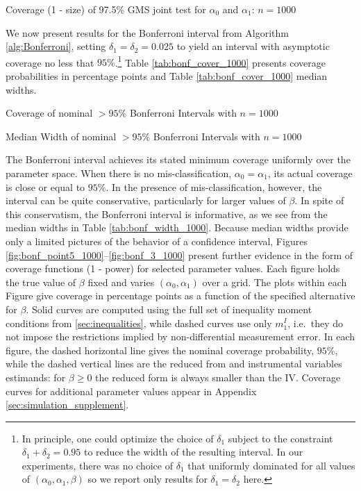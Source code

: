 \begin{table}
  \small
  \centering
  
  \caption{Coverage (1 - size) of 97.5\% GMS joint test for $\alpha_0$ and $\alpha_1$: $n = 1000$}
  \label{tab:alphas_cover_97point5_1000}
\end{table}

We now present results for the Bonferroni interval from Algorithm \ref{alg:Bonferroni}, setting $\delta_1 = \delta_2 = 0.025$ to yield an interval with asymptotic coverage no less that $95\%$.\footnote{In principle, one could optimize the choice of $\delta_1$ subject to the constraint $\delta_1 + \delta_2 = 0.95$ to reduce the width of the resulting interval. In our experiments, there was no choice of $\delta_1$ that uniformly dominated for all values of $(\alpha_0, \alpha_1, \beta)$ so we report only results for $\delta_1 = \delta_2$ here.}
Table \ref{tab:bonf_cover_1000} presents coverage probabilities in percentage points and Table \ref{tab:bonf_cover_1000} median widths.


\begin{table}[htbp]
  \centering
  \small
  
  \caption{Coverage of nominal $>95\%$ Bonferroni Intervals with $n = 1000$}
  \label{tab:bonf_cover_1000}
\end{table}

\begin{table}
  \small
  \centering
  
  \caption{Median Width of nominal $>95\%$ Bonferroni Intervals with $n = 1000$}
  \label{tab:bonf_width_1000}
\end{table}

The Bonferroni interval achieves its stated minimum coverage uniformly over the parameter space.
When there is no mis-classification, $\alpha_0 = \alpha_1$, its actual coverage is close or equal to $95\%$.
In the presence of mis-classification, however, the interval can be quite conservative, particularly for larger values of $\beta$.
In spite of this conservatism, the Bonferroni interval is informative, as we see from the median widths in Table \ref{tab:bonf_width_1000}. 
Because median widths provide only a limited pictures of the behavior of a confidence interval, Figures \ref{fig:bonf_point5_1000}--\ref{fig:bonf_3_1000} present further evidence in the form of coverage functions (1 - power) for selected parameter values.
Each figure holds the true value of $\beta$ fixed and varies $(\alpha_0, \alpha_1)$ over a grid. 
The plots within each Figure give coverage in percentage points as a function of the specified alternative for $\beta$.
Solid curves are computed using the full set of inequality moment conditions from \ref{sec:inequalities}, while dashed curves use only $m_{1}^I$, i.e.\ they do not impose the restrictions implied by non-differential measurement error.
In each figure, the dashed horizontal line gives the nominal coverage probability, $95\%$, while the dashed vertical lines are the reduced from  and instrumental variables estimands: for $\beta \geq 0$ the reduced form is always smaller than the IV.
Coverage curves for additional parameter values appear in Appendix \ref{sec:simulation_supplement}. 


